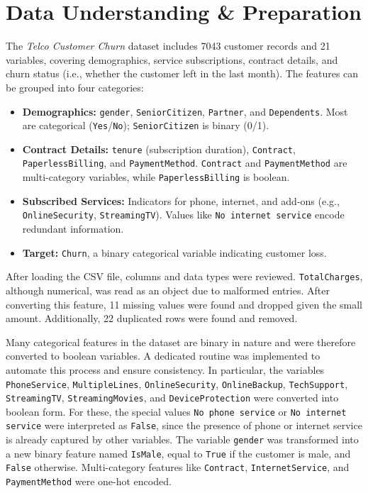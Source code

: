 \documentclass[a4paper,11pt]{article}
\begin{document}
\section{Data Understanding \& Preparation}
The \textit{Telco Customer Churn} dataset includes 7043 customer records and 21 variables, covering demographics, service subscriptions, contract details, and churn status (i.e., whether the customer left in the last month). The features can be grouped into four categories:

\begin{itemize}
    \item \textbf{Demographics:} \texttt{gender}, \texttt{SeniorCitizen}, \texttt{Partner}, and \texttt{Dependents}. Most are categorical (\texttt{Yes}/\texttt{No}); \texttt{SeniorCitizen} is binary (0/1).
    \sloppy
    \item \textbf{Contract Details:} \texttt{tenure} (subscription duration), \texttt{Contract}, \texttt{PaperlessBilling}, and \texttt{PaymentMethod}. \texttt{Contract} and \texttt{PaymentMethod} are multi-category variables, while \texttt{PaperlessBilling} is boolean.
    
    \item \textbf{Subscribed Services:} Indicators for phone, internet, and add-ons (e.g., \texttt{OnlineSecurity}, \texttt{StreamingTV}). Values like \texttt{No internet service} encode redundant information.
    
    \item \textbf{Target:} \texttt{Churn}, a binary categorical variable indicating customer loss.
\end{itemize}

After loading the CSV file, columns and data types were reviewed. \texttt{TotalCharges}, although numerical, was read as an object due to malformed entries. After converting this feature, 11 missing values were found and dropped given the small amount. Additionally, 22 duplicated rows were found and removed.

Many categorical features in the dataset are binary in nature and were therefore converted to boolean variables. A dedicated routine was implemented to automate this process and ensure consistency. In particular, the variables \texttt{PhoneService}, \texttt{MultipleLines}, \texttt{OnlineSecurity}, \texttt{OnlineBackup}, \texttt{TechSupport}, \texttt{StreamingTV}, \texttt{StreamingMovies}, and \texttt{DeviceProtection} were converted into boolean form. For these, the special values \texttt{No phone service} or \texttt{No internet service} were interpreted as \texttt{False}, since the presence of phone or internet service is already captured by other variables. The variable \texttt{gender} was transformed into a new binary feature named \texttt{IsMale}, equal to \texttt{True} if the customer is male, and \texttt{False} otherwise. Multi-category features like \texttt{Contract}, \texttt{InternetService}, and \texttt{PaymentMethod} were one-hot encoded.
\end{document}
